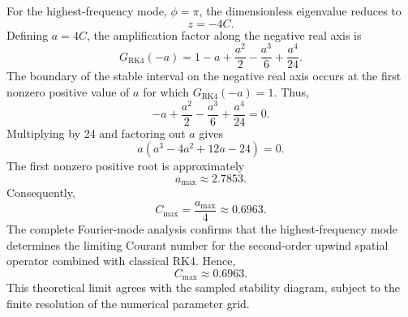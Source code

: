 For the highest-frequency mode, $\phi=\pi$, the dimensionless eigenvalue reduces to
\begin{equation}
    z=-4C.
    \label{eq:app-rk4-high-frequency-z}
\end{equation}
Defining $a=4C$, the amplification factor along the negative real axis is
\begin{equation}
    G_{\mathrm{RK4}}(-a)
    =1-a+\frac{a^2}{2}-\frac{a^3}{6}+\frac{a^4}{24}.
    \label{eq:app-rk4-negative-real-axis}
\end{equation}
The boundary of the stable interval on the negative real axis occurs at the first nonzero positive value of $a$ for which $G_{\mathrm{RK4}}(-a)=1$. Thus,
\begin{equation}
    -a+\frac{a^2}{2}-\frac{a^3}{6}+\frac{a^4}{24}=0.
\end{equation}
Multiplying by 24 and factoring out $a$ gives
\begin{equation}
    a\left(a^3-4a^2+12a-24\right)=0.
\end{equation}
The first nonzero positive root is approximately
\begin{equation}
    a_{\max}\approx 2.7853.
\end{equation}
Consequently,
\begin{equation}
    C_{\max}=\frac{a_{\max}}{4}\approx 0.6963.
\end{equation}
The complete Fourier-mode analysis confirms that the highest-frequency mode determines the limiting Courant number for the second-order upwind spatial operator combined with classical RK4. Hence,
\begin{equation}
    \boxed{C_{\max}\approx 0.6963}.
    \label{eq:app-rk4-cfl-limit}
\end{equation}
This theoretical limit agrees with the sampled stability diagram, subject to the finite resolution of the numerical parameter grid.
